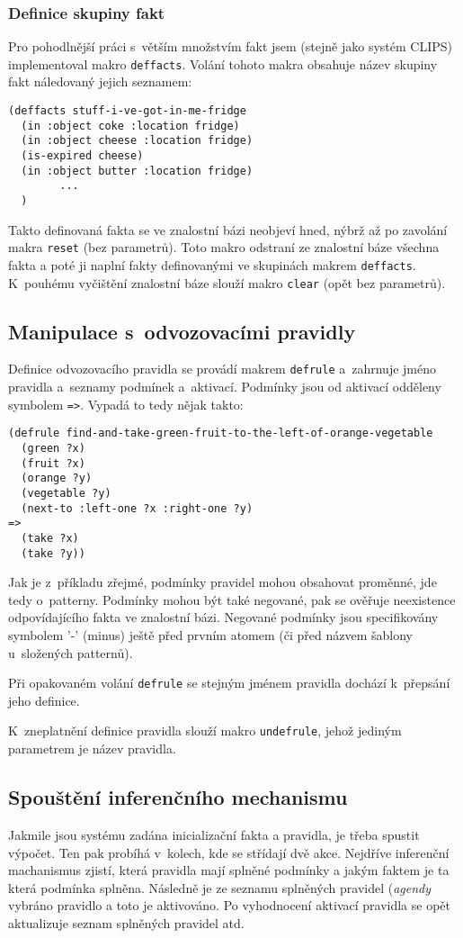 \subsubsection{Definice skupiny fakt}
Pro pohodlnější práci s~větším množstvím fakt jsem (stejně jako systém
CLIPS) implementoval makro \verb|deffacts|. Volání tohoto makra obsahuje
název skupiny fakt náledovaný jejich seznamem:
\begin{verbatim}
(deffacts stuff-i-ve-got-in-me-fridge
  (in :object coke :location fridge)
  (in :object cheese :location fridge)
  (is-expired cheese)
  (in :object butter :location fridge)
        ...
  )
\end{verbatim}
Takto definovaná fakta se ve znalostní bázi neobjeví hned, nýbrž až po zavolání
makra \verb|reset| (bez parametrů). Toto makro odstraní ze znalostní báze
všechna fakta a poté ji naplní fakty definovanými ve skupinách makrem
\verb|deffacts|. K~pouhému vyčištění znalostní báze slouží makro \verb|clear|
(opět bez parametrů).
\subsection{Manipulace s~odvozovacími pravidly}
Definice odvozovacího pravidla se provádí makrem \verb|defrule| a~zahrnuje jméno
pravidla a~seznamy podmínek a~aktivací. Podmínky jsou od aktivací odděleny
symbolem \verb|=>|. Vypadá to tedy nějak takto:
\begin{verbatim}
(defrule find-and-take-green-fruit-to-the-left-of-orange-vegetable
  (green ?x)
  (fruit ?x)
  (orange ?y)
  (vegetable ?y)
  (next-to :left-one ?x :right-one ?y)
=>
  (take ?x)
  (take ?y))
\end{verbatim}
Jak je z~příkladu zřejmé, podmínky pravidel mohou obsahovat proměnné, jde tedy
o~patterny. Podmínky mohou být také negované, pak se ověřuje neexistence
odpovídajícího fakta ve znalostní bázi. Negované podmínky jsou specifikovány
symbolem '-' (minus) ještě před prvním atomem (či před názvem šablony u~složených
patternů).

Při opakovaném volání \verb|defrule| se stejným jménem pravidla dochází 
k~přepsání jeho definice.

K~zneplatnění definice pravidla slouží makro \verb|undefrule|, jehož jediným
parametrem je název pravidla.
\subsection{Spouštění inferenčního mechanismu}
Jakmile jsou systému zadána inicializační fakta a pravidla, je třeba spustit
výpočet. Ten pak probíhá v~kolech, kde se střídají dvě akce. Nejdříve inferenční
machanismus zjistí, která pravidla mají splněné podmínky a jakým faktem je ta
která podmínka splněna. Následně je ze seznamu splněných pravidel (\emph{agendy}
vybráno pravidlo a toto je aktivováno. Po vyhodnocení aktivací pravidla se opět
aktualizuje seznam splněných pravidel atd.

